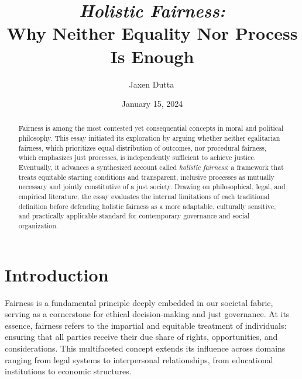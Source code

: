 \documentclass[11pt,showkeys]{essay}
\begin{document}
\title{\textit{Holistic Fairness:}\\
Why Neither Equality Nor Process Is Enough}

\author{Jaxen Dutta\, }

\date{January 15, 2024}

\begin{abstract}
Fairness is among the most contested yet consequential concepts in moral and political philosophy. This essay initiated its exploration by arguing whether neither egalitarian fairness, which prioritizes equal distribution of outcomes, nor procedural fairness, which emphasizes just processes, is independently sufficient to achieve justice. Eventually, it advances a synthesized account called \textit{holistic fairness}: a framework that treats equitable starting conditions and transparent, inclusive processes as mutually necessary and jointly constitutive of a just society. Drawing on philosophical, legal, and empirical literature, the essay evaluates the internal limitations of each traditional definition before defending holistic fairness as a more adaptable, culturally sensitive, and practically applicable standard for contemporary governance and social organization.
\end{abstract}


\maketitle

\section{Introduction}

Fairness is a fundamental principle deeply embedded in our societal fabric, serving as a cornerstone for ethical decision-making and just governance. At its essence, fairness refers to the impartial and equitable treatment of individuals: ensuring that all parties receive their due share of rights, opportunities, and considerations. This multifaceted concept extends its influence across domains ranging from legal systems to interpersonal relationships, from educational institutions to economic structures.
\end{document}
